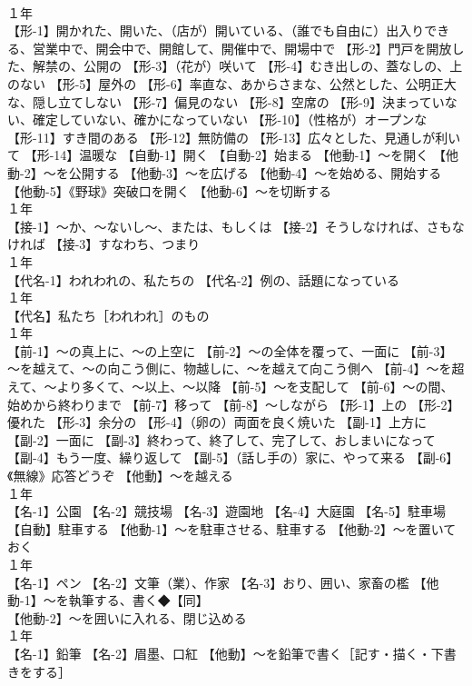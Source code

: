 \documentclass[8pt]{extreport}
\begin{document}
\begin{CJK}{UTF8}{min}
\\	１年	
\\	【形-1】開かれた、開いた、（店が）開いている、（誰でも自由に）出入りできる、営業中で、開会中で、開館して、開催中で、開場中で 【形-2】門戸を開放した、解禁の、公開の 【形-3】（花が）咲いて 【形-4】むき出しの、蓋なしの、上のない 【形-5】屋外の 【形-6】率直な、あからさまな、公然とした、公明正大な、隠し立てしない 【形-7】偏見のない 【形-8】空席の 【形-9】決まっていない、確定していない、確かになっていない 【形-10】（性格が）オープンな 【形-11】すき間のある 【形-12】無防備の 【形-13】広々とした、見通しが利いて 【形-14】温暖な 【自動-1】開く 【自動-2】始まる 【他動-1】～を開く 【他動-2】～を公開する 【他動-3】～を広げる 【他動-4】～を始める、開始する 【他動-5】《野球》突破口を開く 【他動-6】～を切断する
\\	１年	
\\	【接-1】～か、～ないし～、または、もしくは 【接-2】そうしなければ、さもなければ 【接-3】すなわち、つまり
\\	１年	
\\	【代名-1】われわれの、私たちの 【代名-2】例の、話題になっている
\\	１年	
\\	【代名】私たち［われわれ］のもの
\\	１年	
\\	【前-1】～の真上に、～の上空に 【前-2】～の全体を覆って、一面に 【前-3】～を越えて、～の向こう側に、物越しに、～を越えて向こう側へ 【前-4】～を超えて、～より多くて、～以上、～以降 【前-5】～を支配して 【前-6】～の間、始めから終わりまで 【前-7】移って 【前-8】～しながら 【形-1】上の 【形-2】優れた 【形-3】余分の 【形-4】（卵の）両面を良く焼いた 【副-1】上方に 【副-2】一面に 【副-3】終わって、終了して、完了して、おしまいになって 【副-4】もう一度、繰り返して 【副-5】（話し手の）家に、やって来る 【副-6】《無線》応答どうぞ 【他動】～を越える
\\	１年	
\\	【名-1】公園 【名-2】競技場 【名-3】遊園地 【名-4】大庭園 【名-5】駐車場 【自動】駐車する 【他動-1】～を駐車させる、駐車する 【他動-2】～を置いておく
\\	１年	
\\	【名-1】ペン 【名-2】文筆（業）、作家 【名-3】おり、囲い、家畜の檻 【他動-1】～を執筆する、書く◆【同】
\\	【他動-2】～を囲いに入れる、閉じ込める
\\	１年	
\\	【名-1】鉛筆 【名-2】眉墨、口紅 【他動】～を鉛筆で書く［記す・描く・下書きをする］

\end{CJK}
\end{document}
